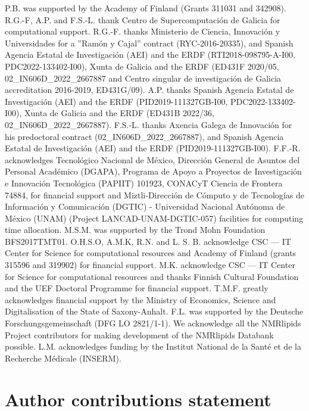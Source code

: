 \documentclass[fleqn,10pt]{wlscirep}
\begin{document}
P.B. was supported by the Academy of Finland (Grants 311031 and 342908).
R.G.-F, A.P. and F.S.-L. thank Centro de Supercomputación de Galicia for computational support.
R.G.-F. thanks Ministerio de Ciencia, Innovaci{\'o}n y Universidades for a ''Ram{\'o}n y Cajal'' contract (RYC-2016-20335), and Spanish Agencia Estatal de Investigaci{\'o}n (AEI) and the ERDF (RTI2018-098795-A-I00, PDC2022-133402-I00), Xunta de Galicia and the ERDF (ED431F 2020/05, 02\_IN606D\_2022\_2667887 and Centro singular de investigaci{\'o}n de Galicia accreditation 2016-2019, ED431G/09). 
A.P. thanks Spanish Agencia Estatal de Investigaci{\'o}n (AEI) and the ERDF (PID2019-111327GB-I00, PDC2022-133402-I00), Xunta de Galicia and the ERDF (ED431B 2022/36, 02\_IN606D\_2022\_2667887).
F.S.-L. thanks Axencia Galega de Innovaci{\'o}n for his predoctoral contract (02\_IN606D\_2022\_2667887), and Spanish Agencia Estatal de Investigaci{\'o}n (AEI) and the ERDF (PID2019-111327GB-I00).
F.F.-R. acknowledges Tecnol{\'o}gico Nacional de M{\'e}xico, Direcci{\'o}n General de Asuntos del Personal Acad{\'e}mico (DGAPA), Programa de Apoyo a Proyectos de Investigaci{\'o}n e Innovaci{\'o}n Tecnol{\'o}gica (PAPIIT) 101923, CONACyT Ciencia de Frontera 74884, for financial support and Miztli-Direcci{\'o}n de C{\'o}mputo y de Tecnolog{\'i}as de Informaci{\'o}n y Comunicaci{\'o}n (DGTIC) - Universidad Nacional Aut{\'o}noma de M{\'e}xico (UNAM) (Project LANCAD-UNAM-DGTIC-057) facilities for computing time allocation.
M.S.M. was supported by the Trond Mohn Foundation BFS2017TMT01.
O.H.S.O, A.M.K, R.N. and L. S. B. acknowledge CSC --- IT Center for Science for computational resources and Academy of Finland (grants 315596 and 319902) for financial support.
M.K. acknowledge CSC –-- IT Center for Science for computational resources and thanks Finnish Cultural Foundation and the UEF Doctoral Programme for financial support. T.M.F. greatly acknowledges financial support by the Ministry of Economics, Science and Digitalisation of the State of Saxony-Anhalt.
F.L. was supported by the Deutsche Forschungsgemeinschaft (DFG LO 2821/1-1).
We acknowledge all the NMRlipids Project contributors for making development of the NMRlipids Databank possible.
L.M. acknowledges funding by the Institut National de la Santé et de la Recherche Médicale (INSERM). 

\section*{Author contributions statement}
\end{document}
